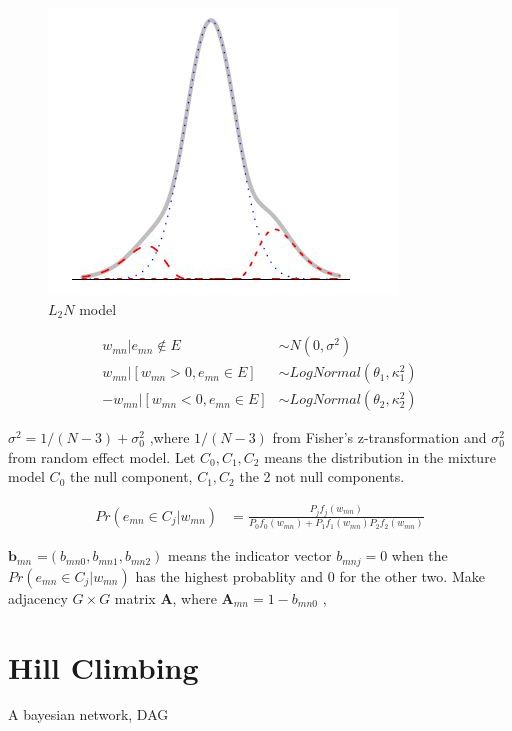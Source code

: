 \documentclass[11pt]{article}
\begin{document}
\begin{figure}[htbp]
\begin{center}
    \includegraphics[scale=1.2]{fig_jpg}
    \caption{$L_{2}N$ model} \label{fig:label}
\end{center}
\end{figure}
  \begin{align}
    w_{mn}|e_{mn}\notin E &\sim N(0,\sigma^2)                 \\
    w_{mn}|[w_{mn}>0,e_{mn}\in E] &\sim LogNormal(\theta_{1},\kappa_{1}^2) 	\\
    - w_{mn}|[w_{mn}<0,e_{mn}\in E] &\sim LogNormal(\theta_{2},\kappa_{2}^2)
  \end{align}

$\sigma^2 = 1/(N-3) + \sigma_{0}^2$ ,where $1/(N-3)$ from Fisher's z-transformation and $\sigma_{0}^2$ from random effect model.
Let $C_{0}, C_{1}, C_{2}$ means the distribution in the mixture model $C_{0}$ the null component, $C_{1}, C_{2}$ the 2 not null components.

  \begin{align}
    Pr(e_{mn} \in C_{j}|w_{mn}) & = \frac{P_{j}f_{j}(w_{mn})}{P_{0}f_{0}(w_{mn})+P_{1}f_{1}(w_{mn})P_{2}f_{2}(w_{mn})}
  \end{align}

$\textbf{b}_{mn}$ =$(b_{mn0},b_{mn1},b_{mn2})$ means the indicator vector $b_{mnj} = 0$  when the $Pr(e_{mn} \in C_{j}|w_{mn}) $ has the highest probablity and 0 for the other two. Make adjacency $G \times G$ matrix $\textbf{A}$, where $\textbf{A}_{mn} = 1- b_{mn0}$ , 
\section{Hill Climbing}
A bayesian network, DAG \
\end{document}
